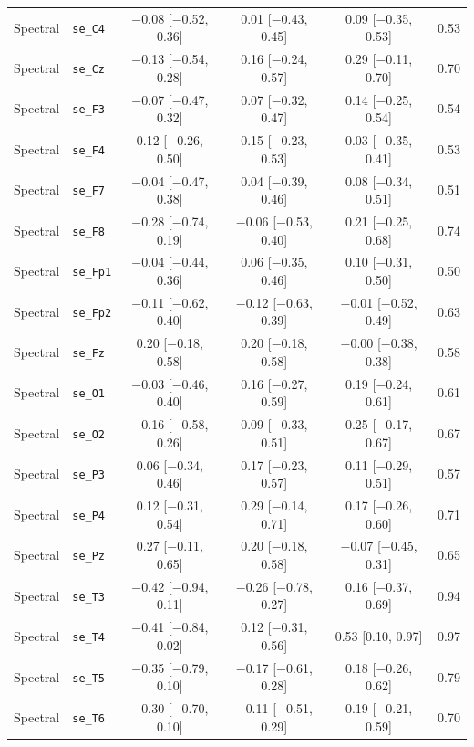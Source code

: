 {\begin{longtable}{llcccc}
Spectral & \texttt{se\_C4} & $-$0.08 [$-$0.52, 0.36] & 0.01 [$-$0.43, 0.45] & 0.09 [$-$0.35, 0.53] & 0.53 \\
Spectral & \texttt{se\_Cz} & $-$0.13 [$-$0.54, 0.28] & 0.16 [$-$0.24, 0.57] & 0.29 [$-$0.11, 0.70] & 0.70 \\
Spectral & \texttt{se\_F3} & $-$0.07 [$-$0.47, 0.32] & 0.07 [$-$0.32, 0.47] & 0.14 [$-$0.25, 0.54] & 0.54 \\
Spectral & \texttt{se\_F4} & 0.12 [$-$0.26, 0.50] & 0.15 [$-$0.23, 0.53] & 0.03 [$-$0.35, 0.41] & 0.53 \\
Spectral & \texttt{se\_F7} & $-$0.04 [$-$0.47, 0.38] & 0.04 [$-$0.39, 0.46] & 0.08 [$-$0.34, 0.51] & 0.51 \\
Spectral & \texttt{se\_F8} & $-$0.28 [$-$0.74, 0.19] & $-$0.06 [$-$0.53, 0.40] & 0.21 [$-$0.25, 0.68] & 0.74 \\
Spectral & \texttt{se\_Fp1} & $-$0.04 [$-$0.44, 0.36] & 0.06 [$-$0.35, 0.46] & 0.10 [$-$0.31, 0.50] & 0.50 \\
Spectral & \texttt{se\_Fp2} & $-$0.11 [$-$0.62, 0.40] & $-$0.12 [$-$0.63, 0.39] & $-$0.01 [$-$0.52, 0.49] & 0.63 \\
Spectral & \texttt{se\_Fz} & 0.20 [$-$0.18, 0.58] & 0.20 [$-$0.18, 0.58] & $-$0.00 [$-$0.38, 0.38] & 0.58 \\
Spectral & \texttt{se\_O1} & $-$0.03 [$-$0.46, 0.40] & 0.16 [$-$0.27, 0.59] & 0.19 [$-$0.24, 0.61] & 0.61 \\
Spectral & \texttt{se\_O2} & $-$0.16 [$-$0.58, 0.26] & 0.09 [$-$0.33, 0.51] & 0.25 [$-$0.17, 0.67] & 0.67 \\
Spectral & \texttt{se\_P3} & 0.06 [$-$0.34, 0.46] & 0.17 [$-$0.23, 0.57] & 0.11 [$-$0.29, 0.51] & 0.57 \\
Spectral & \texttt{se\_P4} & 0.12 [$-$0.31, 0.54] & 0.29 [$-$0.14, 0.71] & 0.17 [$-$0.26, 0.60] & 0.71 \\
Spectral & \texttt{se\_Pz} & 0.27 [$-$0.11, 0.65] & 0.20 [$-$0.18, 0.58] & $-$0.07 [$-$0.45, 0.31] & 0.65 \\
Spectral & \texttt{se\_T3} & $-$0.42 [$-$0.94, 0.11] & $-$0.26 [$-$0.78, 0.27] & 0.16 [$-$0.37, 0.69] & 0.94 \\
Spectral & \texttt{se\_T4} & $-$0.41 [$-$0.84, 0.02] & 0.12 [$-$0.31, 0.56] & 0.53 [0.10, 0.97] & 0.97 \\
Spectral & \texttt{se\_T5} & $-$0.35 [$-$0.79, 0.10] & $-$0.17 [$-$0.61, 0.28] & 0.18 [$-$0.26, 0.62] & 0.79 \\
Spectral & \texttt{se\_T6} & $-$0.30 [$-$0.70, 0.10] & $-$0.11 [$-$0.51, 0.29] & 0.19 [$-$0.21, 0.59] & 0.70 \\

\end{longtable}}
